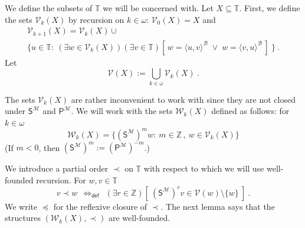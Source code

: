 \documentclass[10pt,a4paper, openany,  oldfontcommands]{memoir}
\newtheorem{open problem} [theorem] {Open Problem}
\newtheorem{open question} [theorem] {Open Question}
\renewcommand{\mathrm}{\mathsf}
\begin{document}
We define the subsets of  $  \mathbb{T}  $  we will be concerned with. 
Let  $  X  \subseteq  \mathbb{T}  $. 
First,  we  define  the    sets    $  \mathcal{V}_k     \left(  X \right)   $   by recursion  on $  k \in  \omega  $:  
$  \mathcal{V}_0     \left(   X \right)   =  X $  and 
\begin{multline*}
\mathcal{V}_{ k+1}     \left( X  \right)    =  \mathcal{V}_k    \left(  X \right)  
 \cup     
 \\
 \Big\{  u   \in  \mathbb{T}   :   \     
      \left(  \exists   w  \in  \mathcal{V}_k  \left(   X  \right)    \right)    \left(  \exists  v  \in  \mathbb{T}  \right)  
      \left[  \,   w  =  \langle  u,  v  \rangle^{  \mathcal{B}  }     \;  \vee   \;    w  =  \langle  v,  u  \rangle^{  \mathcal{B}  }     \,   \right]  
      \    \Big\} 
     \        .
\end{multline*}
Let  
\[
 \mathcal{V}     \left(   X \right)    :=  \bigcup_{ k  \in  \omega  }      \mathcal{V}_k     \left(  X \right)   
 \         .
\]







The sets   $  \mathcal{V}_k     \left(  X \right)   $   are rather inconvenient to work with since they are not closed  under 
 $  \mathrm{S}^{  \mathcal{M}  }  $   and    $  \mathrm{P}^{  \mathcal{M}  }  $. 
We will work with the  sets  $  \mathcal{W}_k     \left(  X \right)   $ defined as follows:  for  $  k  \in  \omega  $
\[
  \mathcal{W}_k     \left(  X \right)   =  
   \Big\{   \left(  \mathrm{S}^{  \mathcal{M}  }  \right)^m  w  :   \   
  m  \in   \mathbb{Z}  \,  ,    \     w  \in     \mathcal{V}_k     \left(  X \right)      \Big\}
\]
(If  $  m  <  0  $,  then    $  \left(  \mathrm{S}^{  \mathcal{M}  }  \right)^m  :=    \left(  \mathrm{P}^{  \mathcal{M}  }  \right)^{-m}  $.)


We  introduce a partial order  $  \prec   $  on  $ \mathbb{T}  $  with respect to which we will use  well-founded recursion. 
For  $  w,  v  \in  \mathbb{T} $
\[
v  \prec  w      \     \      \Leftrightarrow_{  \mathsf{def}  }        \       \ 
 \left(  \exists  r  \in  \mathbb{Z}  \right)   \left[   \    
 \left(  \mathrm{S}^{  \mathcal{M}  }  \right)^r  v  \in    \mathcal{V}     \left(  w   \right)    \setminus \lbrace w  \rbrace   \   \right] 
\        .
\]
We write  $  \preceq  $  for the reflexive closure of  $  \prec  $.
The next lemma says that the structures  $  \left(    \mathcal{W}_k     \left(  X \right)   ,  \prec   \right)   $  are well-founded. 
\end{document}
